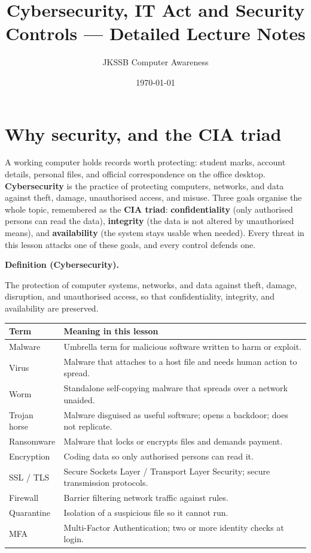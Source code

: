 \documentclass[11pt]{article}
\title{Cybersecurity, IT Act and Security Controls --- Detailed Lecture Notes}
\author{JKSSB Computer Awareness}
\date{\today}
\newenvironment{definitionbox}[1]{%
  \par\noindent\textbf{Definition (#1).}\ \itshape
}{\par\vspace{0.3em}}
\begin{document}
\maketitle

\section{Why security, and the CIA triad}
A working computer holds records worth protecting: student marks, account
details, personal files, and official correspondence on the office desktop.
\textbf{Cybersecurity} is the practice of protecting computers, networks,
and data against theft, damage, unauthorised access, and misuse. Three
goals organise the whole topic, remembered as the \textbf{CIA triad}:
\textbf{confidentiality} (only authorised persons can read the data),
\textbf{integrity} (the data is not altered by unauthorised means), and
\textbf{availability} (the system stays usable when needed). Every threat
in this lesson attacks one of these goals, and every control defends one.

\begin{definitionbox}{Cybersecurity}
The protection of computer systems, networks, and data against theft,
damage, disruption, and unauthorised access, so that confidentiality,
integrity, and availability are preserved.
\end{definitionbox}

\begin{center}
\begin{tabular}{p{}p{}}
\toprule
\textbf{Term} & \textbf{Meaning in this lesson} \\
\midrule
Malware & Umbrella term for malicious software written to harm or exploit. \\
Virus & Malware that attaches to a host file and needs human action to spread. \\
Worm & Standalone self-copying malware that spreads over a network unaided. \\
Trojan horse & Malware disguised as useful software; opens a backdoor; does not replicate. \\
Ransomware & Malware that locks or encrypts files and demands payment. \\
Encryption & Coding data so only authorised persons can read it. \\
SSL / TLS & Secure Sockets Layer / Transport Layer Security; secure transmission protocols. \\
Firewall & Barrier filtering network traffic against rules. \\
Quarantine & Isolation of a suspicious file so it cannot run. \\
MFA & Multi-Factor Authentication; two or more identity checks at login. \\
\bottomrule
\end{tabular}
\end{center}
\end{document}
